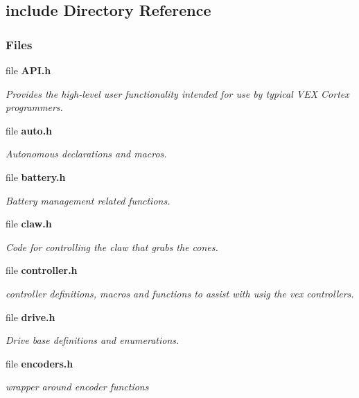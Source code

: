 \subsection{include Directory Reference}
\label{dir_d44c64559bbebec7f509842c48db8b23}
\subsubsection*{Files}
\begin{DoxyCompactItemize}
\item 
file \textbf{ A\+P\+I.\+h}
\begin{DoxyCompactList}\small\item\em Provides the high-\/level user functionality intended for use by typical V\+EX Cortex programmers. \end{DoxyCompactList}\item 
file \textbf{ auto.\+h}
\begin{DoxyCompactList}\small\item\em Autonomous declarations and macros. \end{DoxyCompactList}\item 
file \textbf{ battery.\+h}
\begin{DoxyCompactList}\small\item\em Battery management related functions. \end{DoxyCompactList}\item 
file \textbf{ claw.\+h}
\begin{DoxyCompactList}\small\item\em Code for controlling the claw that grabs the cones. \end{DoxyCompactList}\item 
file \textbf{ controller.\+h}
\begin{DoxyCompactList}\small\item\em controller definitions, macros and functions to assist with usig the vex controllers. \end{DoxyCompactList}\item 
file \textbf{ drive.\+h}
\begin{DoxyCompactList}\small\item\em Drive base definitions and enumerations. \end{DoxyCompactList}\item 
file \textbf{ encoders.\+h}
\begin{DoxyCompactList}\small\item\em wrapper around encoder functions \end{DoxyCompactList}\item 

\end{DoxyCompactItemize}

